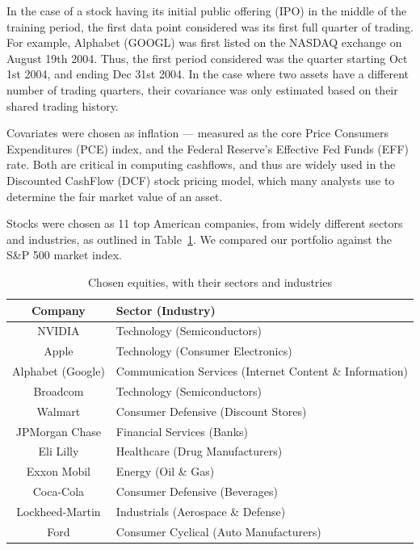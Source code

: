 \documentclass[11pt]{article}
\begin{document}
In the case of a stock having its initial public offering (IPO) in the middle of the training period, the first data point considered was its first full quarter of trading. For example, Alphabet (GOOGL) was first listed on the NASDAQ exchange on August 19th 2004. Thus, the first period considered was the quarter starting Oct 1st 2004, and ending Dec 31st 2004. In the case where two assets have a different number of trading quarters, their covariance was only estimated based on their shared trading history.

Covariates were chosen as inflation --- measured as the core Price Consumers Expenditures (PCE) index, and the Federal Reserve's Effective Fed Funds (EFF) rate. Both are critical in computing cashflows, and thus are widely used in the Discounted CashFlow (DCF) stock pricing model, which many analysts use to determine the fair market value of an asset.

Stocks were chosen as 11 top American companies, from widely different sectors and industries, as outlined in Table~\ref{table:companies}. We compared our portfolio against the S\&P 500 market index. 

\begin{table}[t]
    \centering
    \begin{tabular}{|c|p{3in}|}
\hline Company & Sector (Industry) \\ \hline
NVIDIA & Technology (Semiconductors) \\ \hline
Apple  & Technology (Consumer Electronics) \\ \hline
Alphabet (Google) & Communication Services (Internet Content \& Information) \\ \hline
Broadcom & Technology (Semiconductors) \\ \hline
Walmart  & Consumer Defensive (Discount Stores) \\ \hline
JPMorgan Chase & Financial Services (Banks) \\ \hline
Eli Lilly  & Healthcare (Drug Manufacturers) \\ \hline
Exxon Mobil & Energy (Oil \& Gas) \\ \hline
Coca-Cola & Consumer Defensive (Beverages) \\ \hline 
Lockheed-Martin & Industrials (Aerospace \& Defense) \\ \hline
Ford & Consumer Cyclical (Auto Manufacturers) \\ \hline
    \end{tabular}
    \caption{Chosen equities, with their sectors and industries}
    \label{table:companies}
\end{table}
\end{document}
